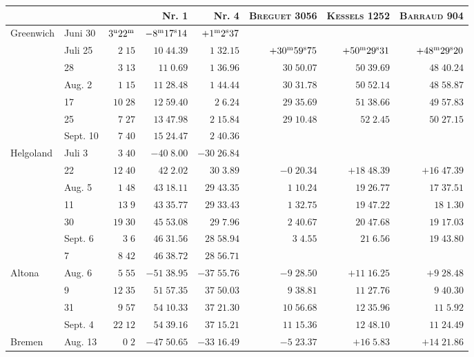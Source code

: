 \begin{center}
\begingroup\fontsize{8}{10}\selectfont\setlength{\tabcolsep}{2pt}
\begin{tabular}{ll|r|r|r|r|r|r}
 & & & Nr. 1 & Nr. 4 & \textsc{Breguet} 3056 & \textsc{Kessels} 1252 & \textsc{Barraud} 904 \\
\hline
Greenwich & Juni 30 & $3^{\rm u}22^{\rm m}$ & $-8^{\rm m}17^{\rm s}14$ & $+1^{\rm m}2^{\rm s}37$ &  &  &  \\
 & Juli 25 & $2\;15$ & $10\;44.39$ & $1\;32.15$ & $+30^{\rm m}59^{\rm s}75$ & $+50^{\rm m}29^{\rm s}31$ & $+48^{\rm m}29^{\rm s}20$ \\
 & 28 & $3\;13$ & $11\;0.69$ & $1\;36.96$ & $30\;50.07$ & $50\;39.69$ & $48\;40.24$ \\
 & Aug. 2 & $1\;15$ & $11\;28.48$ & $1\;44.44$ & $30\;31.78$ & $50\;52.14$ & $48\;58.87$ \\
 & 17 & $10\;28$ & $12\;59.40$ & $2\;6.24$ & $29\;35.69$ & $51\;38.66$ & $49\;57.83$ \\
 & 25 & $7\;27$ & $13\;47.98$ & $2\;15.84$ & $29\;10.48$ & $52\;2.45$ & $50\;27.15$ \\
 & Sept. 10 & $7\;40$ & $15\;24.47$ & $2\;40.36$ &  &  &  \\
Helgoland & Juli 3 & $3\;40$ & $-40\;8.00$ & $-30\;26.84$ &  &  &  \\
 & 22 & $12\;40$ & $42\;2.02$ & $30\;3.89$ & $-0\;20.34$ & $+18\;48.39$ & $+16\;47.39$ \\
 & Aug. 5 & $1\;48$ & $43\;18.11$ & $29\;43.35$ & $1\;10.24$ & $19\;26.77$ & $17\;37.51$ \\
 & 11 & $13\;9$ & $43\;35.77$ & $29\;33.43$ & $1\;32.75$ & $19\;47.22$ & $18\;1.30$ \\
 & 30 & $19\;30$ & $45\;53.08$ & $29\;7.96$ & $2\;40.67$ & $20\;47.68$ & $19\;17.03$ \\
 & Sept. 6 & $3\;6$ & $46\;31.56$ & $28\;58.94$ & $3\;4.55$ & $21\;6.56$ & $19\;43.80$ \\
 & 7 & $8\;42$ & $46\;38.72$ & $28\;56.71$ &  &  &  \\
Altona & Aug. 6 & $5\;55$ & $-51\;38.95$ & $-37\;55.76$ & $-9\;28.50$ & $+11\;16.25$ & $+9\;28.48$ \\
 & 9 & $12\;35$ & $51\;57.35$ & $37\;50.03$ & $9\;38.81$ & $11\;27.76$ & $9\;40.30$ \\
 & 31 & $9\;57$ & $54\;10.33$ & $37\;21.30$ & $10\;56.68$ & $12\;35.96$ & $11\;5.92$ \\
 & Sept. 4 & $22\;12$ & $54\;39.16$ & $37\;15.21$ & $11\;15.36$ & $12\;48.10$ & $11\;24.49$ \\
Bremen & Aug. 13 & $0\;2$ & $-47\;50.65$ & $-33\;16.49$ & $-5\;23.37$ & $+16\;5.83$ & $+14\;21.86$ \\
\end{tabular}
\endgroup
\end{center}

